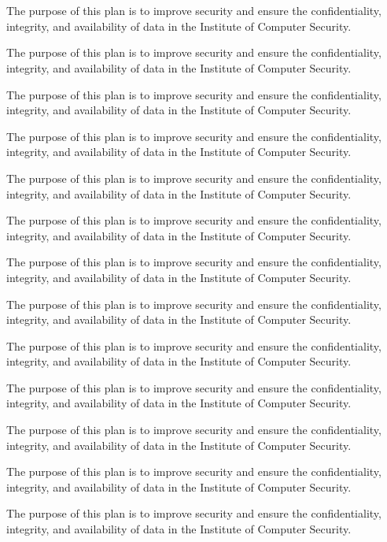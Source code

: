 \chapter{   }

The purpose of this plan is to improve security and ensure the confidentiality, integrity, and availability of data in the Institute of Computer Security.

The purpose of this plan is to improve security and ensure the confidentiality, integrity, and availability of data in the Institute of Computer Security.

The purpose of this plan is to improve security and ensure the confidentiality, integrity, and availability of data in the Institute of Computer Security.

The purpose of this plan is to improve security and ensure the confidentiality, integrity, and availability of data in the Institute of Computer Security.

The purpose of this plan is to improve security and ensure the confidentiality, integrity, and availability of data in the Institute of Computer Security.

The purpose of this plan is to improve security and ensure the confidentiality, integrity, and availability of data in the Institute of Computer Security.

The purpose of this plan is to improve security and ensure the confidentiality, integrity, and availability of data in the Institute of Computer Security.

The purpose of this plan is to improve security and ensure the confidentiality, integrity, and availability of data in the Institute of Computer Security.

The purpose of this plan is to improve security and ensure the confidentiality, integrity, and availability of data in the Institute of Computer Security.

The purpose of this plan is to improve security and ensure the confidentiality, integrity, and availability of data in the Institute of Computer Security.

The purpose of this plan is to improve security and ensure the confidentiality, integrity, and availability of data in the Institute of Computer Security.

The purpose of this plan is to improve security and ensure the confidentiality, integrity, and availability of data in the Institute of Computer Security.

The purpose of this plan is to improve security and ensure the confidentiality, integrity, and availability of data in the Institute of Computer Security.

